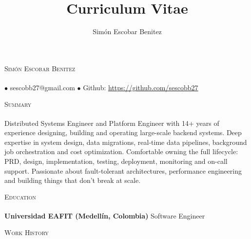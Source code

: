\documentclass[a4paper]{article}
\title{Curriculum Vitae}
\author{Sim\'on Escobar Benitez}
\newcommand{\lineunder}{\vspace*{-8pt} \\ \hspace*{-18pt} \hrulefill \\}
\newcommand{\header}[1]{{\hspace*{-15pt}\vspace*{6pt}
  \textsc{#1}} \vspace*{-6pt} \lineunder}
\newcommand{\contact}[2]{
  \vspace*{-8pt}
  \begin{center}
  {\LARGE \scshape {#1}} \lineunder #2
  \end{center}
  \vspace*{-8pt} }
\newcommand{\schoolwithcourses}[2]{
  \textbf{#1} #2
  \vspace*{5pt} }
\begin{document}
  \small
  \smallskip
  \vspace*{-44pt}
  \contact{Sim\'on Escobar Benitez} { $\bullet$ sescobb27@gmail.com $\bullet$ Github: \url{https://github.com/sescobb27} }

  \header{Summary}
  Distributed Systems Engineer and Platform Engineer with 14+ years of experience designing, building and operating large-scale backend systems. Deep expertise in system design, data migrations, real-time data pipelines, background job orchestration and cost optimization. Comfortable owning the full lifecycle: PRD, design, implementation, testing, deployment, monitoring and on-call support. Passionate about fault-tolerant architectures, performance engineering and building things that don't break at scale.

  \header{Education}
  \schoolwithcourses{Universidad EAFIT (Medell\'in, Colombia)}{Software Engineer}

  \header{Work History}
\end{document}
